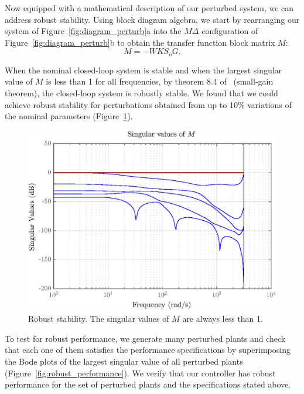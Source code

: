 \documentclass[12pt,lot, lof]{puthesis}
\begin{document}
Now equipped with a mathematical description of our perturbed system, we can address robust stability.
Using block diagram algebra, we start by rearranging our system of Figure~\ref{fig:diagram_perturb}a into the $M \Delta$ configuration of Figure~\ref{fig:diagram_perturb}b to obtain the transfer function block matrix $M$:
\begin{equation}
	M = -W K S_o G.
\end{equation}

When the nominal closed-loop system is stable and when the largest singular value of $M$ is less than 1 for all frequencies, by theorem 8.4 of~\cite{SandP} (small-gain theorem), the closed-loop system is robustly stable.
We found that we could achieve robust stability for perturbations obtained from up to 10\% variations of the nominal parameters (Figure~\ref{fig:robust_stability}).

\begin{figure}[htbp]
	\centering
	\includegraphics{chap10/robust_stability}
	\caption{Robust stability. The singular values of $M$ are always less than 1.}
	\label{fig:robust_stability}
\end{figure}


To test for robust performance, we generate many perturbed plants and check that each one of them satisfies the performance specifications by superimposing the Bode plots of the largest singular value of all perturbed plants (Figure~\ref{fig:robust_performance}).
We verify that our controller has robust performance for the set of perturbed plants and the specifications stated above.
\end{document}
